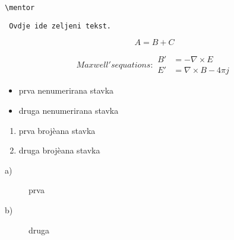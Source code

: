 \pageref{oznaka}	%


\verb|\mentor|

\begin{verbatim}
 Ovdje ide zeljeni tekst.
\end{verbatim}



\begin{equation}
 A = B + C   \label{eq:prva}
\end{equation}


\begin{subequations}
Maxwell's equations:
\begin{align}
        B'&=-\nabla \times E  \label{subeq:prva} \\
        E'&=\nabla \times B - 4\pi j  \label{subeq:druga}
\end{align}
\label{subeq:prvaidruga}
\end{subequations}


\begin{itemize}
 \setlength\itemsep{1ex} %
	\item prva nenumerirana stavka
	\item druga nenumerirana stavka
\end{itemize}

\begin{enumerate}[itemsep=1ex, topsep=4pt, partopsep=0pt]
	\item prva brojèana stavka
	\item druga brojèana stavka
\end{enumerate}

\begin{description}
	\item[a)] prva
	\item[b)] druga
\end{description}


